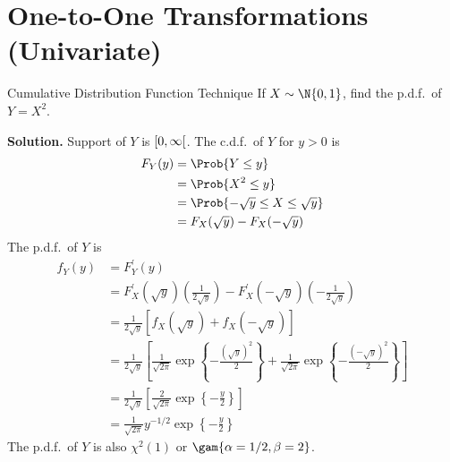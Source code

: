 \section{One-to-One Transformations (Univariate)}
\begin{Example}{Cumulative Distribution Function Technique}{}
    If $ X \sim \N{0,1} $, find the p.d.f.\ of $ Y=X^2 $.

    \textbf{Solution.} Support of $ Y $ is $ \interval[open right]{0}{\infty} $.
    The c.d.f.\ of $ Y $ for $ y>0 $ is
    \begin{align*}
        F_Y(y)
         & =\Prob{Y\le y}                     \\
         & =\Prob{X^2\le y}                   \\
         & =\Prob{-\sqrt{y}\le X\le \sqrt{y}} \\
         & =F_X(\sqrt{y})-F_X(-\sqrt{y})
    \end{align*}
    The p.d.f.\ of $ Y $ is
    \begin{align*}
        f_Y(y)
         & =F_Y^\prime(y)                                                   \\
         & =F_X^\prime(\sqrt{y})\left( \frac{1}{2\sqrt{y}} \right)-
        F_X^\prime(-\sqrt{y})\left(-\frac{1}{2\sqrt{y}}\right)              \\
         & =\frac{1}{2\sqrt{y}}
        \left[ f_X(\sqrt{y})+f_X(-\sqrt{y})  \right]                        \\
         & =\frac{1}{2\sqrt{y}}
        \left[
            \frac{1}{\sqrt{2\pi}}\exp\left\{ -\frac{(\sqrt{y})^2}{2}\right\}
            +
            \frac{1}{\sqrt{2\pi}}\exp\left\{ -\frac{(-\sqrt{y})^2}{2}\right\}
        \right]                                                             \\
         & =\frac{1}{2\sqrt{y}}
        \left[ \frac{2}{\sqrt{2\pi}}\exp\left\{-\frac{y}{2}\right\} \right] \\
         & =\frac{1}{\sqrt{2\pi}}y^{-1/2}\exp\left\{ -\frac{y}{2} \right\}
    \end{align*}
    The p.d.f.\ of $ Y $ is also $ \chi^2(1) $ or
    $ \gam{\alpha=1/2,\beta=2} $.
\end{Example}
